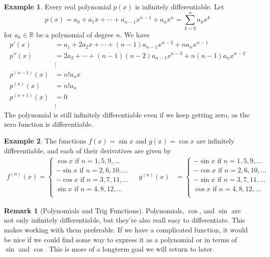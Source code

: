 \documentclass{article}
\newcommand{\R}{\mathbb{R}}
\theoremstyle{definition}
\newtheorem{example}{Example}[section]
\newtheorem{remark}{Remark}[section]
\begin{document}
\begin{example}
	Every real polynomial $ p(x) $ is infinitely differentiable. Let 
	$$p(x)=a_0+a_1x+\cdots+a_{n-1}x^{n-1}+a_nx^n=\sum_{k=0}^{n}a_kx^k $$ for $ a_k\in\R $ be a polynomial of degree $ n $.
	We have \begin{align*}
		p'(x)&=a_1+2a_2x+\cdots+(n-1)a_{n-1}x^{n-2}+na_nx^{n-1}\\
		p''(x)&=2a_2+\cdots+(n-1)(n-2)a_{n-1}x^{n-3}+n(n-1)a_nx^{n-2}\\
		&\vdots\\
		p^{(n-1)}(x)&=n!a_nx\\
		p^{(n)}(x)&=n!a_n\\
		p^{(n+1)}(x)&=0\\
		&\vdots
	\end{align*} 
	The polynomial is still infinitely differentiable even if we keep getting zero, as the zero function is differentiable.
\end{example}
\begin{example}
	The functions $ f(x)=\sin x $ and  $g(x)=\cos x $ are infinitely differentiable, and each of their derivatives are given by 
	\begin{align*}
	f^{(n)}(x)=\begin{cases}
	\cos x \text{ if }n=1,5,9,\ldots\\
	-\sin x \text{ if }n=2,6,10,\ldots\\
	-\cos x \text{ if }n=3,7,11,\ldots\\
	\sin x \text{ if }n=4,8,12,\ldots\\
	\end{cases} \ \ \ \ \ 	g^{(n)}(x)&=\begin{cases}
	-\sin x \text{ if }n=1,5,9,\ldots\\
	-\cos x \text{ if }n=2,6,10,\ldots\\
	-\sin x \text{ if }n=3,7,11,\ldots\\
	\cos x \text{ if }n=4,8,12,\ldots\\
	\end{cases}
	\end{align*}
\end{example}
\begin{remark}[Polynomials and Trig Functions]
	Polynomials, $ \cos $, and $ \sin $ are not only infinitely differentiable, but they're also reall easy to differentiate. This makes working with them preferable. If we have a complicated function, it would be nice if we could find some way to express it as a polynomial or in terms of $ \sin $ and $ \cos $. This is more of a longterm goal we will return to later. 
\end{remark}
\end{document}
